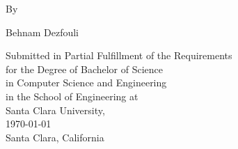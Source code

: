 \newpage\thispagestyle{empty}


\begin{center}
\vspace*{15mm}
{\bf\large \thesisTitle}

\par\vspace{8mm}
By 

\par\vspace{8mm}
Behnam Dezfouli

\par\vspace{50mm}
\end{center}

\vspace{20mm}

\begin{center}
Submitted in Partial Fulfillment of the Requirements\\
for the Degree of Bachelor of Science\\
in Computer Science and Engineering\\
in the School of Engineering at\\
Santa Clara University, \\
\vspace{20pt}
\today \\

\vspace{20mm}
Santa Clara, California


\end{center}

